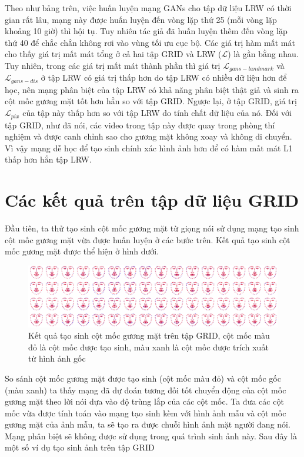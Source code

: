 Theo như bảng trên, việc huấn luyện mạng GANs cho tập dữ liệu LRW có thời gian rất lâu, mạng này được huấn luyện đến vòng lặp thứ 25 (mỗi vòng lặp khoảng 10 giờ) thì hội tụ. Tuy nhiên tác giả đã huấn luyện thêm đến vòng lặp thứ 40 để chắc chắn không rơi vào vùng tối ưu cục bộ. Các giá trị hàm mất mát cho thấy giá trị mất mát tổng ở cả hai tập GRID và LRW ($\mathcal{L}$) là gần bằng nhau. Tuy nhiên, trong các giá trị mất mát thành phần thì giá trị $\mathcal{L}_{gans-landmark}$ và $\mathcal{L}_{gans-dis}$ ở tập LRW có giá trị thấp hơn do tập LRW có nhiều dữ liệu hơn để học, nên mạng phân biệt của tập LRW có khả năng phân biệt thật giả và sinh ra cột mốc gương mặt tốt hơn hẳn so với tập GRID. Ngược lại, ở tập GRID, giá trị $\mathcal{L}_{pix}$ của tập này thấp hơn so với tập LRW do tính chất dữ liệu của nó. Đối với tập GRID, như đã nói, các video trong tập này được quay trong phòng thí nghiệm và được canh chỉnh sao cho gương mặt không xoay và không di chuyển. Vì vậy mạng dễ học để tạo sinh chính xác hình ảnh hơn để có hàm mất mát L1 thấp hơn hẳn tập LRW.


\section{Các kết quả trên tập dữ liệu GRID}

Đầu tiên, ta thử tạo sinh cột mốc gương mặt từ giọng nói sử dụng mạng tạo sinh cột mốc gương mặt vừa được huấn luyện ở các bước trên. Kết quả tạo sinh cột mốc gương mặt được thể hiện ở hình dưới.

\begin{figure}[H]
    \centering
    \includegraphics[width=15cm]{./content/materials/grid_examples-landmark.png}
    \caption{Kết quả tạo sinh cột mốc gương mặt trên tập GRID, cột mốc màu đỏ là cột mốc được tạo sinh, màu xanh là cột mốc được trích xuất từ hình ảnh gốc}
\end{figure}

So sánh cột mốc gương mặt được tạo sinh (cột mốc màu đỏ) và cột mốc gốc (màu xanh) ta thấy mạng đã dự đoán tương đối tốt chuyển động của cột mốc gương mặt theo lời nói dựa vào độ trùng lắp của các cột mốc. Ta đưa các cột mốc vừa được tính toán vào mạng tạo sinh kèm với hình ảnh mẫu và cột mốc gương mặt của ảnh mẫu, ta sẽ tạo ra được chuỗi hình ảnh mặt người đang nói. Mạng phân biệt sẽ không được sử dụng trong quá trình sinh ảnh này. Sau đây là một số ví dụ tạo sinh ảnh trên tập GRID


